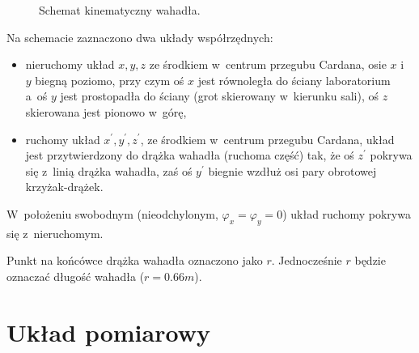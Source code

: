 \documentclass[paper=a4,DIV=12]{tmmlab}
\begin{document}
\begin{figure}[htbp]
  \caption{Schemat kinematyczny wahadła.}
  \label{fig:7YP7N}
\end{figure}
Na schemacie zaznaczono dwa układy współrzędnych:
\begin{itemize}
  \item nieruchomy układ $x,y,z$ ze środkiem w~centrum przegubu Cardana, osie
        $x$ i~$y$ biegną poziomo, przy czym oś $x$ jest równoległa do ściany
        laboratorium a~oś $y$ jest prostopadła do ściany (grot skierowany
        w~kierunku sali), oś $z$ skierowana jest pionowo w~górę,
  \item ruchomy układ $x^{\prime}, y^{\prime}, z^{\prime}$, ze środkiem w~centrum przegubu
        Cardana, układ jest przytwierdzony do drążka wahadła (ruchoma część)
        tak, że oś $z^{\prime}$ pokrywa się z~linią drążka wahadła, zaś oś $y^{\prime}$
        biegnie wzdłuż osi pary obrotowej krzyżak-drążek.
\end{itemize}
W~położeniu swobodnym (nieodchylonym, $\varphi_x = \varphi_y=0$) układ
ruchomy pokrywa się z~nieruchomym.

Punkt na końcówce drążka wahadła oznaczono jako $r$. Jednocześnie
$r$ będzie oznaczać długość wahadła ($r = 0.66m$).


\section{Układ pomiarowy}
\label{sec:Z2CJY}
\end{document}

